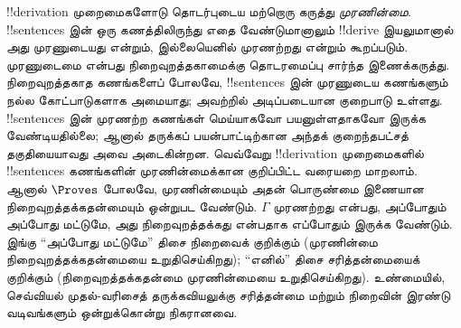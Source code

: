 \documentclass[../../../include/open-logic-section]{subfiles}
\begin{document}
!!{derivation} முறைமைகளோடு தொடர்புடைய மற்றொரு கருத்து
\emph{முரணின்மை}. !!{sentence}s இன் ஒரு கணத்திலிருந்து எதை
வேண்டுமானாலும் !!{derive} இயலுமானால் அது முரணுடையது என்றும், இல்லையெனில்
முரணற்றது என்றும் கூறப்படும். முரணுடைமை என்பது நிறைவுறத்தகாமைக்கு
தொடரமைப்பு சார்ந்த இணைக்கருத்து. நிறைவுறத்தகாத கணங்களைப் போலவே,
!!{sentence}s இன் முரணுடைய கணங்களும் நல்ல கோட்பாடுகளாக அமையாது; அவற்றில்
அடிப்படையான குறைபாடு உள்ளது. !!{sentence}s இன் முரணற்ற கணங்கள் மெய்யாகவோ
பயனுள்ளதாகவோ இருக்க வேண்டியதில்லை; ஆனால் தருக்கப் பயன்பாட்டிற்கான அந்தக்
குறைந்தபட்சத் தகுதியையாவது அவை அடைகின்றன. வெவ்வேறு !!{derivation}
முறைமைகளில் !!{sentence}s கணங்களின் முரணின்மைக்கான குறிப்பிட்ட வரையறை
மாறலாம். ஆனால் $\Proves$ போலவே, முரணின்மையும் அதன் பொருண்மை இணையான
நிறைவுறத்தக்கதன்மையும் ஒன்றுபட வேண்டும். $\Gamma$ முரணற்றது என்பது,
அப்போதும் அப்போது மட்டுமே, அது நிறைவுறத்தக்கது என்பதாக எப்போதும் இருக்க
வேண்டும். இங்கு ``அப்போது மட்டுமே'' திசை நிறைவைக் குறிக்கும் (முரணின்மை
நிறைவுறத்தக்கதன்மையை உறுதிசெய்கிறது); ``எனில்'' திசை சரித்தன்மையைக்
குறிக்கும் (நிறைவுறத்தக்கதன்மை முரணின்மையை உறுதிசெய்கிறது). உண்மையில்,
செவ்வியல் முதல்-வரிசைத் தருக்கவியலுக்கு சரித்தன்மை மற்றும் நிறைவின்
இரண்டு வடிவங்களும் ஒன்றுக்கொன்று நிகரானவை.
\end{document}
